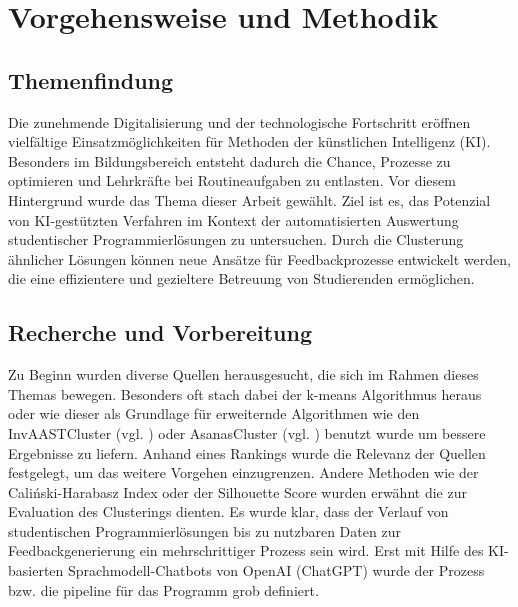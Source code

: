 \chapter{Vorgehensweise und Methodik}

\section{Themenfindung}
Die zunehmende Digitalisierung und der technologische Fortschritt eröffnen vielfältige Einsatzmöglichkeiten für Methoden der künstlichen Intelligenz (KI). Besonders im Bildungsbereich entsteht dadurch die Chance, Prozesse zu optimieren und Lehrkräfte bei Routineaufgaben zu entlasten. Vor diesem Hintergrund wurde das Thema dieser Arbeit gewählt. Ziel ist es, das Potenzial von KI-gestützten Verfahren im Kontext der automatisierten Auswertung studentischer Programmierlösungen zu untersuchen. Durch die Clusterung ähnlicher Lösungen können neue Ansätze für Feedbackprozesse entwickelt werden, die eine effizientere und gezieltere Betreuung von Studierenden ermöglichen.

\section{Recherche und Vorbereitung}
Zu Beginn wurden diverse Quellen herausgesucht, die sich im Rahmen dieses Themas bewegen. Besonders oft stach dabei der k-means Algorithmus heraus oder wie dieser als Grundlage für erweiternde Algorithmen wie den InvAASTCluster (vgl. \cite{Orvalho.28.06.2022}) oder AsanasCluster (vgl. \cite{Paiva.2024}) benutzt wurde um bessere Ergebnisse zu liefern. Anhand eines Rankings wurde die Relevanz der Quellen festgelegt, um das weitere Vorgehen einzugrenzen. Andere Methoden wie der Caliński-Harabasz Index oder der Silhouette Score wurden erwähnt die zur Evaluation des Clusterings dienten. Es wurde klar, dass der Verlauf von studentischen Programmierlösungen bis zu nutzbaren Daten zur Feedbackgenerierung ein mehrschrittiger Prozess sein wird. Erst mit Hilfe des KI-basierten Sprachmodell-Chatbots von OpenAI (ChatGPT) wurde der Prozess bzw. die pipeline für das Programm grob definiert. 

